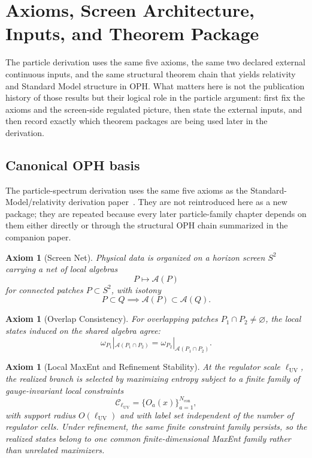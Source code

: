 \documentclass[11pt]{article}
\newtheorem{axiom}[theorem]{Axiom}
\begin{document}
\section{Axioms, Screen Architecture, Inputs, and Theorem Package}

The particle derivation uses the same five axioms, the same two declared external continuous
inputs, and the same structural theorem chain that yields relativity and Standard Model
structure in OPH. What matters here is not the publication history of those
results but their logical role in the particle argument: first fix the axioms and the screen-side
regulated picture, then state the external inputs, and then record exactly which theorem packages
are being used later in the derivation.

\subsection{Canonical OPH basis}

The particle-spectrum derivation uses the same five axioms as the Standard-Model/relativity derivation paper~\cite{ophcompact}. They are not
reintroduced here as a new package; they are repeated because every later particle-family
chapter depends on them either directly or through the structural OPH chain summarized in the
companion paper.

\begin{axiom}[Screen Net]\label{ax:screen}
Physical data is organized on a horizon screen \(S^2\) carrying a net of local algebras
\[
P \longmapsto \mathcal A(P)
\]
for connected patches \(P\subset S^2\), with isotony
\[
P\subset Q \implies \mathcal A(P)\subset \mathcal A(Q).
\]
\end{axiom}

\begin{axiom}[Overlap Consistency]\label{ax:overlap}
For overlapping patches \(P_1\cap P_2\neq\varnothing\), the local states induced on the shared
algebra agree:
\[
\omega_{P_1}|_{\mathcal A(P_1\cap P_2)}
=
\omega_{P_2}|_{\mathcal A(P_1\cap P_2)}.
\]
\end{axiom}

\begin{axiom}[Local MaxEnt and Refinement Stability]\label{ax:maxent}
At the regulator scale \(\ell_{\mathrm{UV}}\), the realized branch is selected by maximizing
entropy subject to a finite family of gauge-invariant local constraints
\[
\mathcal C_{\ell_{\mathrm{UV}}}=\{O_a(x)\}_{a=1}^{N_{\mathrm{con}}},
\]
with support radius \(O(\ell_{\mathrm{UV}})\) and with label set independent of the number of
regulator cells. Under refinement, the same finite constraint family persists, so the realized
states belong to one common finite-dimensional MaxEnt family rather than unrelated maximizers.
\end{axiom}
\end{document}

